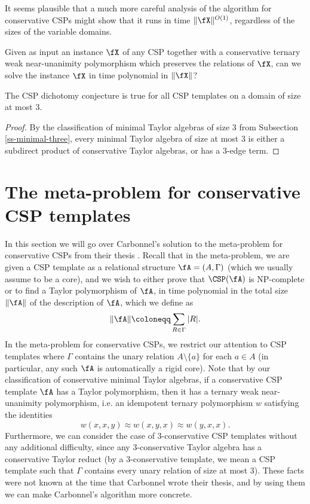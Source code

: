 It seems plausible that a much more careful analysis of the algorithm for conservative CSPs might show that it runs in time $\|\fX\|^{O(1)}$, regardless of the sizes of the variable domains.

\begin{prob}\label{conservative-uniform} Given as input an instance $\fX$ of any CSP together with a conservative ternary weak near-unanimity polymorphism which preserves the relations of $\fX$, can we solve the instance $\fX$ in time polynomial in $\|\fX\|$?
\end{prob}

\begin{cor} The CSP dichotomy conjecture is true for all CSP templates on a domain of size at most $3$.
\end{cor}
\begin{proof} By the classification of minimal Taylor algebras of size $3$ from Subsection \ref{ss-minimal-three}, every minimal Taylor algebra of size at most $3$ is either a subdirect product of conservative Taylor algebras, or has a $3$-edge term.
\end{proof}


\section{The meta-problem for conservative CSP templates}

In this section we will go over Carbonnel's solution to the meta-problem for conservative CSPs from their thesis \cite{carbonnel-thesis}. Recall that in the meta-problem, we are given a CSP template as a relational structure $\fA = (A, \Gamma)$ (which we usually assume to be a core), and we wish to either prove that $\CSP(\fA)$ is NP-complete or to find a Taylor polymorphism of $\fA$, in time polynomial in the total size $\|\fA\|$ of the description of $\fA$, which we define as
\[
\|\fA\| \coloneqq \sum_{R \in \Gamma} |R|.
\]
In the meta-problem for conservative CSPs, we restrict our attention to CSP templates where $\Gamma$ contains the unary relation $A\setminus \{a\}$ for each $a \in A$ (in particular, any such $\fA$ is automatically a rigid core). Note that by our classification of conservative minimal Taylor algebras, if a conservative CSP template $\fA$ has a Taylor polymorphism, then it has a ternary weak near-unanimity polymorphism, i.e. an idempotent ternary polymorphism $w$ satisfying the identities
\[
w(x,x,y) \approx w(x,y,x) \approx w(y,x,x).
\]
Furthermore, we can consider the case of $3$-conservative CSP templates without any additional difficulty, since any $3$-conservative Taylor algebra has a conservative Taylor reduct (by a $3$-conservative template, we mean a CSP template such that $\Gamma$ contains every unary relation of size at most $3$). These facts were not known at the time that Carbonnel wrote their thesis, and by using them we can make Carbonnel's algorithm more concrete.

